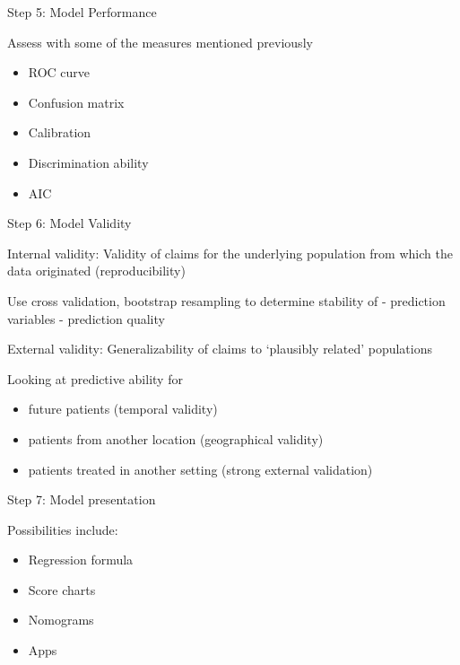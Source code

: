\documentclass[10pt,ignorenonframetext,]{beamer}
\providecommand{\tightlist}{%
\setlength{\itemsep}{0pt}\setlength{\parskip}{0pt}}
\begin{document}
\begin{frame}{Step 5: Model Performance}

Assess with some of the measures mentioned previously

\begin{itemize}[<+->]
\tightlist
\item
  ROC curve
\item
  Confusion matrix
\item
  Calibration
\item
  Discrimination ability
\item
  AIC
\end{itemize}

\end{frame}

\begin{frame}{Step 6: Model Validity}

Internal validity: Validity of claims for the underlying population from
which the data originated (reproducibility)

Use cross validation, bootstrap resampling to determine stability of -
prediction variables - prediction quality

External validity: Generalizability of claims to `plausibly related'
populations

Looking at predictive ability for

\begin{itemize}[<+->]
\tightlist
\item
  future patients (temporal validity)
\item
  patients from another location (geographical validity)
\item
  patients treated in another setting (strong external validation)
\end{itemize}

\end{frame}

\begin{frame}{Step 7: Model presentation}

Possibilities include:

\begin{itemize}[<+->]
\tightlist
\item
  Regression formula
\item
  Score charts
\item
  Nomograms
\item
  Apps
\end{itemize}

\end{frame}
\end{document}
